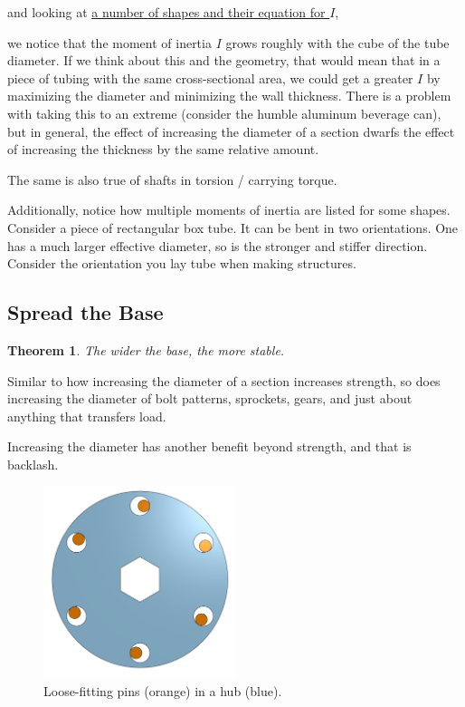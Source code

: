 \documentclass[10pt,letterpaper]{book}
\newtheorem{theorem}{Theorem}
\begin{document}
and looking at \href{https://en.wikipedia.org/wiki/List_of_second_moments_of_area}{\color{red}\underline{a number of shapes and their equation for $I$}},

 we notice that the moment of inertia $I$ grows roughly with the cube of the tube diameter. If we think about this and the geometry, that would mean that in a piece of tubing with the same cross-sectional area, we could get a greater $I$ by maximizing the diameter and minimizing the wall thickness. There is a problem with taking this to an extreme (consider the humble aluminum beverage can), but in general, the effect of increasing the diameter of a section dwarfs the effect of increasing the thickness by the same relative amount.

The same is also true of shafts in torsion / carrying torque.

Additionally, notice how multiple moments of inertia are listed for some shapes. Consider a piece of rectangular box tube. It can be bent in two orientations. One has a much larger effective diameter, so is the stronger and stiffer direction. Consider the orientation you lay tube when making structures.

\subsection{Spread the Base}

\begin{theorem} \label{theorem:spread_base}
The wider the base, the more stable.
\end{theorem}

Similar to how increasing the diameter of a section increases strength, so does increasing the diameter of bolt patterns, sprockets, gears, and just about anything that transfers load.

Increasing the diameter has another benefit beyond strength, and that is backlash.

\begin{figure}
	\includegraphics[width=0.5\textwidth]{imgs/hub_tolerance.png}
	\caption{Loose-fitting pins (orange) in a hub (blue).}
\end{figure}
\end{document}
